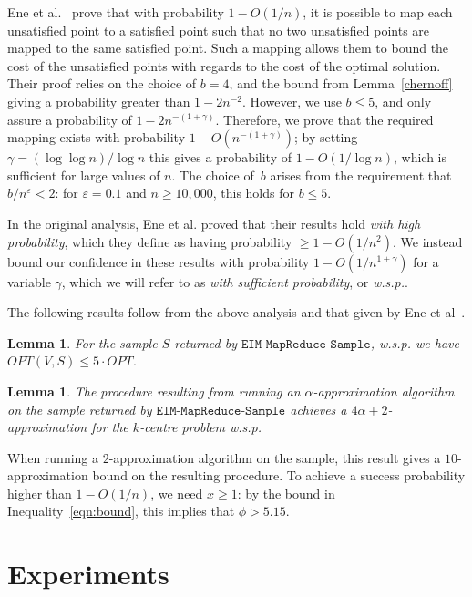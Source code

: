 \documentclass[11pt]{article}
\newtheorem{lemma}[theorem]{Lemma}
\newcommand{\eps}{\ensuremath{\varepsilon}}
\newcommand{\OPT}{\ensuremath{\mathit{OPT}}}
\begin{document}
Ene et al.~\cite{ene2011fast} prove that with probability $1-O(1/n)$, it is possible to map each unsatisfied point to a satisfied point such that no two unsatisfied points are mapped to the same satisfied point. 
Such a mapping allows them to bound the cost of the unsatisfied points with regards to the cost of the optimal solution. 
Their proof relies on the choice of $b=4$, and the bound from Lemma~\ref{chernoff} giving a probability greater than $1-2n^{-2}$. 
However, we use $b\leq 5$, and only assure a probability of $1-2n^{-(1+\gamma)}$. 
Therefore, we prove that the required mapping exists with probability $1-O(n^{-(1+\gamma)})$; by setting $\gamma = (\log\log n)/\log n$ this gives a probability of  $1-O(1/\log n)$, which is sufficient for large values of $n$. 
The choice of~$b$ arises from the requirement that $b/n^{\eps}<2$:
for $\eps =0.1$ and $n\geq 10,\!000$, this holds for $b\leq 5$. 


In the original analysis, Ene et al. proved that their results hold \emph{with high probability}, which they define as having probability $\geq 1-O(1/n^2)$.
We instead bound our confidence in these results with probability $1-O(1/n^{1+\gamma})$ for a variable $\gamma$, which we will refer to as \emph{with sufficient probability}, or \emph{w.s.p.}. 


The following results follow from the above analysis and that given by Ene et al~\cite{ene2011fast}. 

\begin{lemma}
For the sample $S$ returned by $\texttt{EIM{-}MapReduce{-}Sample}$,
\emph{w.s.p.} we have $\OPT(V,S) \leq 5\cdot \OPT$.
\end{lemma}



\begin{lemma}
The procedure resulting from running an $\alpha$-approximation algorithm on the sample returned by  $\texttt{EIM{-}MapReduce{-}Sample}$ achieves a $4\alpha+2$-approximation for the $k$-centre problem   \emph{w.s.p.}
\end{lemma}


When running a $2$-approximation algorithm on the sample, this result gives a $10$-approximation bound on the resulting procedure. 
To achieve a success probability higher than $1-O(1/n)$, we need $x\geq 1$: by
the bound in Inequality~\eqref{eqn:bound}, this implies that $\phi>5.15$.



\section{Experiments}
\end{document}
